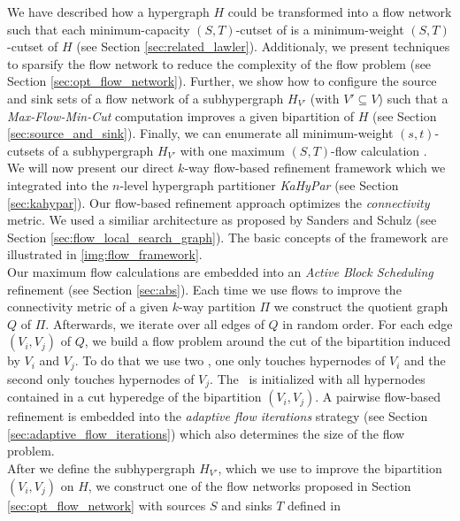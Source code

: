 We have described how a hypergraph $H$ could be transformed into
a flow network  such that each minimum-capacity $(S,T)$-cutset of  is a 
minimum-weight  $(S,T)$-cutset of $H$ (see Section \ref{sec:related_lawler}). 
Additionaly, we present techniques to sparsify the
flow network  \cite{lawler1973} to reduce the complexity of 
the flow problem (see Section \ref{sec:opt_flow_network}). 
Further, we show how to configure the source and sink sets of a flow network of a 
subhypergraph $H_{V'}$ (with $V' \subseteq V$) such that a \emph{Max-Flow-Min-Cut} 
computation improves a given bipartition of $H$ (see Section \ref{sec:source_and_sink}). 
Finally, we can enumerate all minimum-weight $(s,t)$-cutsets of a subhypergraph 
$H_{V'}$ with one maximum $(S,T)$-flow calculation \cite{picard1980structure}. \\
We will now present our direct $k$-way flow-based refinement framework which we integrated
into the $n$-level hypergraph partitioner \emph{KaHyPar} \cite{heuer2017improving} 
(see Section \ref{sec:kahypar}). Our flow-based refinement approach optimizes
the \emph{connectivity} metric. We used a similiar architecture as proposed
by Sanders and Schulz \cite{sanders2011engineering} (see Section 
\ref{sec:flow_local_search_graph}). The basic concepts of the framework are
illustrated in \autoref{img:flow_framework}. \\
Our maximum flow calculations are embedded into an \emph{Active Block Scheduling}
refinement \cite{holtgrewe2010engineering} (see Section \ref{sec:abs}).
Each time we use flows to improve the connectivity metric of
a given $k$-way partition $\Pi$ we construct the quotient graph $Q$ of $\Pi$. 
Afterwards, we iterate over all edges of $Q$ in random order. For each edge
$(V_i,V_j)$ of $Q$, we build a flow problem around the cut of the bipartition
induced by $V_i$ and $V_j$. To do that we use two \BFS, one only 
touches hypernodes of $V_i$ and the second only touches hypernodes of $V_j$.
The \BFS~is initialized with all hypernodes contained in a cut hyperedge
of the bipartition $(V_i,V_j)$. A pairwise flow-based refinement is embedded
into the \emph{adaptive flow iterations} strategy \cite{sanders2011engineering}
(see Section \ref{sec:adaptive_flow_iterations}) which also determines
the size of the flow problem. \\
After we define the subhypergraph $H_{V'}$, which we use to improve the bipartition
$(V_i,V_j)$ on $H$, we construct one of the flow networks proposed in Section
\ref{sec:opt_flow_network} with sources $S$ and sinks $T$ defined in
